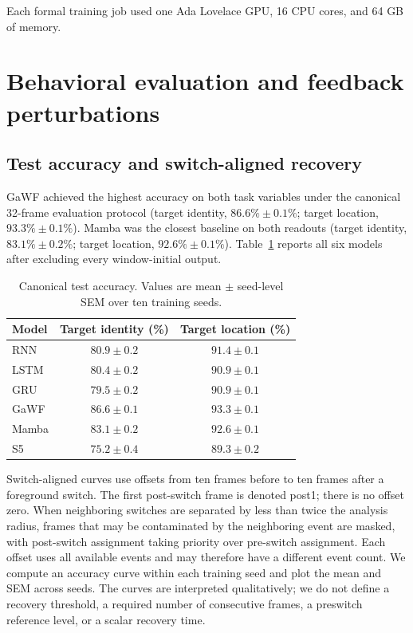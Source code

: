 Each formal training job used one Ada Lovelace GPU, 16 CPU cores, and 64 GB of memory.

\section{Behavioral evaluation and feedback perturbations}
\label{app:behavior}

\subsection{Test accuracy and switch-aligned recovery}

GaWF achieved the highest accuracy on both task variables under the canonical 32-frame evaluation protocol (target identity, \(86.6\%\pm0.1\%\); target location, \(93.3\%\pm0.1\%\)). Mamba was the closest baseline on both readouts (target identity, \(83.1\%\pm0.2\%\); target location, \(92.6\%\pm0.1\%\)). Table~\ref{tab:test-accuracy} reports all six models after excluding every window-initial output.

\begin{table}[t]
\centering
\caption{Canonical test accuracy. Values are mean \(\pm\) seed-level SEM over ten training seeds.}
\label{tab:test-accuracy}
\begin{tabular}{lcc}
\toprule
Model & Target identity (\%) & Target location (\%) \\
\midrule
RNN & \(80.9\pm0.2\) & \(91.4\pm0.1\) \\
LSTM & \(80.4\pm0.2\) & \(90.9\pm0.1\) \\
GRU & \(79.5\pm0.2\) & \(90.9\pm0.1\) \\
GaWF & \(86.6\pm0.1\) & \(93.3\pm0.1\) \\
Mamba & \(83.1\pm0.2\) & \(92.6\pm0.1\) \\
S5 & \(75.2\pm0.4\) & \(89.3\pm0.2\) \\
\bottomrule
\end{tabular}
\end{table}

Switch-aligned curves use offsets from ten frames before to ten frames after a foreground switch. The first post-switch frame is denoted post1; there is no offset zero. When neighboring switches are separated by less than twice the analysis radius, frames that may be contaminated by the neighboring event are masked, with post-switch assignment taking priority over pre-switch assignment. Each offset uses all available events and may therefore have a different event count. We compute an accuracy curve within each training seed and plot the mean and SEM across seeds. The curves are interpreted qualitatively; we do not define a recovery threshold, a required number of consecutive frames, a preswitch reference level, or a scalar recovery time.

